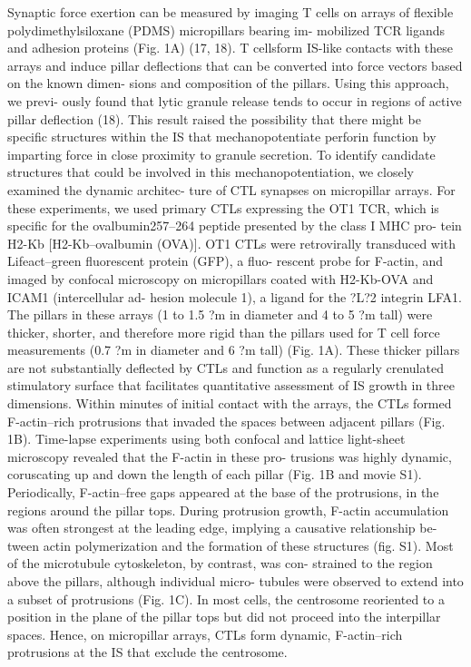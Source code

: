 Synaptic force exertion can be measured by imaging T cells on arrays of flexible polydimethylsiloxane (PDMS) micropillars bearing im- mobilized TCR ligands and adhesion proteins (Fig. 1A) (17, 18). T cellsform IS-like contacts with these arrays and induce pillar deflections that can be converted into force vectors based on the known dimen-
sions and composition of the pillars. Using this approach, we previ- ously found that lytic granule release tends to occur in regions of active pillar deflection (18). This result raised the possibility that there might be specific structures within the IS that mechanopotentiate perforin function by imparting force in close proximity to granule secretion.
To identify candidate structures that could be involved in this mechanopotentiation, we closely examined the dynamic architec- ture of CTL synapses on micropillar arrays. For these experiments, we used primary CTLs expressing the OT1 TCR, which is specific for the ovalbumin257–264 peptide presented by the class I MHC pro- tein H2-Kb [H2-Kb–ovalbumin (OVA)]. OT1 CTLs were retrovirally transduced with Lifeact–green fluorescent protein (GFP), a fluo- rescent probe for F-actin, and imaged by confocal microscopy on micropillars coated with H2-Kb-OVA and ICAM1 (intercellular ad- hesion molecule 1), a ligand for the ?L?2 integrin LFA1. The pillars in these arrays (1 to 1.5 ?m in diameter and 4 to 5 ?m tall) were thicker, shorter, and therefore more rigid than the pillars used for T cell force measurements (0.7 ?m in diameter and 6 ?m tall) (Fig. 1A). These thicker pillars are not substantially deflected by CTLs and function as a regularly crenulated stimulatory surface that facilitates quantitative assessment of IS growth in three dimensions.
Within minutes of initial contact with the arrays, the CTLs formed F-actin–rich protrusions that invaded the spaces between adjacent pillars (Fig. 1B). Time-lapse experiments using both confocal and lattice light-sheet microscopy revealed that the F-actin in these pro-
trusions was highly dynamic, coruscating up and down the length of each pillar (Fig. 1B and movie S1). Periodically, F-actin–free gaps appeared at the base of the protrusions, in the regions around the pillar tops. During protrusion growth, F-actin accumulation was often strongest at the leading edge, implying a causative relationship be- tween actin polymerization and the formation of these structures (fig. S1). Most of the microtubule cytoskeleton, by contrast, was con- strained to the region above the pillars, although individual micro- tubules were observed to extend into a subset of protrusions (Fig. 1C). In most cells, the centrosome reoriented to a position in the plane of the pillar tops but did not proceed into the interpillar spaces. Hence, on micropillar arrays, CTLs form dynamic, F-actin–rich protrusions at the IS that exclude the centrosome.

